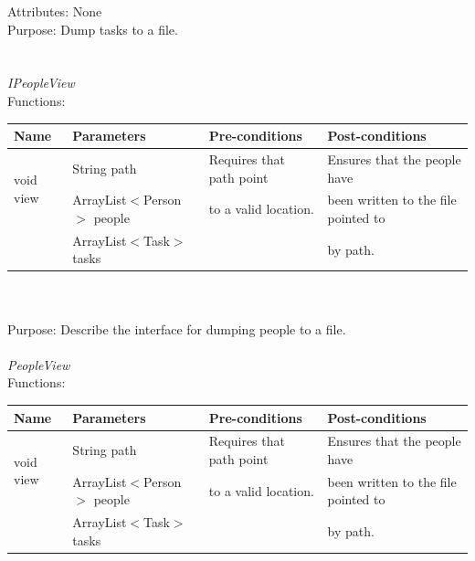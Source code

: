 Attributes: None\\
Purpose: Dump tasks to a file.\\
\\
\\
\emph{IPeopleView}\\
Functions:\\
\begin{tabular}{| l | l | l | l |}
\hline
Name & Parameters & Pre-conditions & Post-conditions\\
\hline
\multirow{2}{*}{void view} & String path                                 & Requires that path point & Ensures that the people have\\ 
			         & ArrayList$<$Person$>$ people & to a valid location.          & been written to the file pointed to\\ 
                                             & ArrayList$<$Task$>$ tasks       &                                         & by path.
\\
\hline
\end{tabular}\\
\\
Purpose: Describe the interface for dumping people to a file.
\\
\\
\emph{PeopleView}\\
Functions:\\
\begin{tabular}{| l | l | l | l |}
\hline
Name & Parameters & Pre-conditions & Post-conditions\\
\hline
\multirow{2}{*}{void view} & String path                                 & Requires that path point & Ensures that the people have\\ 
			        & ArrayList$<$Person$>$ people & to a valid location.          & been written to the file pointed to\\ 
                                            & ArrayList$<$Task$>$ tasks       &                                         & by path.
\\
\hline
\end{tabular}

